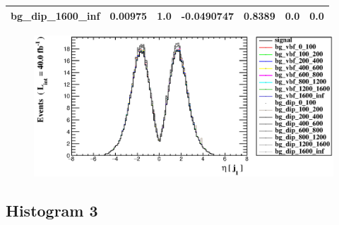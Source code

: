 \documentclass[a4paper, 10pt]{article}
\begin{document}
\begin{table}[H]
\begin{center}
\begin{tabular}{|m{23.0mm}|m{23.0mm}|m{18.0mm}|m{19.0mm}|m{19.0mm}|m{19.0mm}|m{19.0mm}|}
      \hline
      {\cellcolor{white}         bg\_dip\_1600\_inf}& {\cellcolor{white}         0.00975}& {\cellcolor{white}         1.0}& {\cellcolor{white}         -0.0490747}& {\cellcolor{white}         0.8389}& {\cellcolor{green}         0.0}& {\cellcolor{green}         0.0}\\
\hline
    \end{tabular}
  \end{center}
\end{table}

\begin{figure}[H]
  \begin{center}
    \includegraphics[scale=0.45]{selection_1.eps}\\
\caption{   }
  \end{center}
\end{figure}
      \newpage
\subsection{ Histogram 3}
\end{document}
